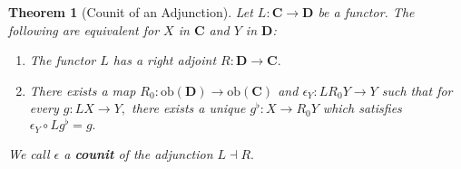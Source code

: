 \documentclass{article}
\newtheorem{theorem}[proposition]{Theorem}
\numberwithin{equation}{section}
\newcommand{\cat}[1]{{\mathbf{#1}}}
\newcommand{\ob}{\mathrm{ob}}
\begin{document}
\begin{theorem}[Counit of an Adjunction]
\label{thm:counit-of-adjunction}
Let $L : \cat{C} \to \cat{D}$ be a functor. The following are equivalent for $X$ in $\cat{C}$ and $Y$ in $\cat{D}$:
\begin{enumerate}
    \item{The functor $L$ has a right adjoint $R : \cat{D} \to \cat{C}.$}
    \item{There exists a map $R_0 : \ob(\cat D) \to \ob(\cat C)$ and $\epsilon_Y : LR_0Y \to Y$ such that for every $g : LX \to Y,$ there exists a unique $g^\flat : X \to R_0Y$ which satisfies $\epsilon_Y \circ Lg^\flat = g.$} 
\end{enumerate}
We call $\epsilon$ a \textbf{counit} of the adjunction $L \dashv R.$ 
\end{theorem}
\end{document}
